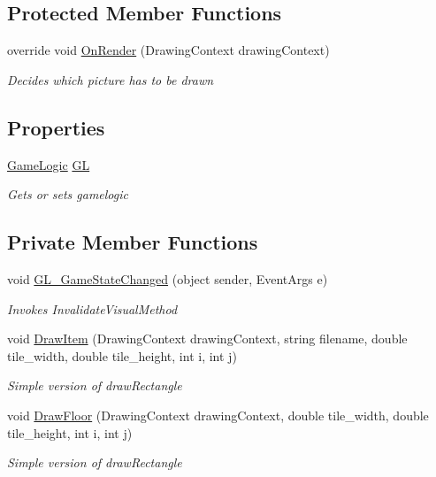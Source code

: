 \subsection*{Protected Member Functions}
\begin{DoxyCompactItemize}
\item 
override void \mbox{\hyperlink{class_bomberman_1_1_u_i_1_1_game_display_aece76d3ef75b0e12e43a281856e11a8e}{On\+Render}} (Drawing\+Context drawing\+Context)
\begin{DoxyCompactList}\small\item\em Decides which picture has to be drawn \end{DoxyCompactList}\end{DoxyCompactItemize}
\subsection*{Properties}
\begin{DoxyCompactItemize}
\item 
\mbox{\hyperlink{class_bomberman_1_1_business_logic_1_1_game_logic}{Game\+Logic}} \mbox{\hyperlink{class_bomberman_1_1_u_i_1_1_game_display_ad5cdf4b412fd89ac0d6555bc965aae13}{GL}}
\begin{DoxyCompactList}\small\item\em Gets or sets gamelogic \end{DoxyCompactList}\end{DoxyCompactItemize}
\subsection*{Private Member Functions}
\begin{DoxyCompactItemize}
\item 
void \mbox{\hyperlink{class_bomberman_1_1_u_i_1_1_game_display_a6531b08c32679bdb8721eab5c9ecebcd}{G\+L\+\_\+\+Game\+State\+Changed}} (object sender, Event\+Args e)
\begin{DoxyCompactList}\small\item\em Invokes Invalidate\+Visual\+Method \end{DoxyCompactList}\item 
void \mbox{\hyperlink{class_bomberman_1_1_u_i_1_1_game_display_ab916a4d1e444517e8a5f1791ecedf672}{Draw\+Item}} (Drawing\+Context drawing\+Context, string filename, double tile\+\_\+width, double tile\+\_\+height, int i, int j)
\begin{DoxyCompactList}\small\item\em Simple version of draw\+Rectangle \end{DoxyCompactList}\item 
void \mbox{\hyperlink{class_bomberman_1_1_u_i_1_1_game_display_a5925b011dc8c2c259af92a4bbd0d1c2c}{Draw\+Floor}} (Drawing\+Context drawing\+Context, double tile\+\_\+width, double tile\+\_\+height, int i, int j)
\begin{DoxyCompactList}\small\item\em Simple version of draw\+Rectangle \end{DoxyCompactList}\end{DoxyCompactItemize}


